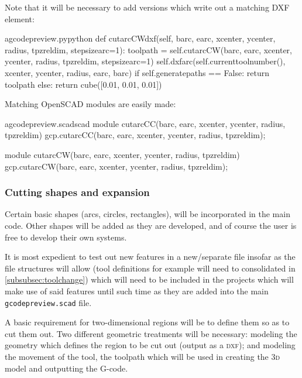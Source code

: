 \documentclass{ltxdoc}
\begin{document}
Note that it will be necessary to add versions which write out a matching DXF element:


\lstset{firstnumber=\thegcpy}
\begin{writecode}{a}{gcodepreview.py}{python}
    def cutarcCWdxf(self, barc, earc, xcenter, ycenter, radius, tpzreldim, stepsizearc=1):
        toolpath = self.cutarcCW(barc, earc, xcenter, ycenter, radius, tpzreldim, stepsizearc=1)
        self.dxfarc(self.currenttoolnumber(), xcenter, ycenter, radius, earc, barc)
        if self.generatepaths == False:
            return toolpath
        else:
            return cube([0.01, 0.01, 0.01])


\end{writecode}
\addtocounter{gcpy}{45}

Matching OpenSCAD modules are easily made:

\lstset{firstnumber=\thegcpscad}
\begin{writecode}{a}{gcodepreview.scad}{scad}
module cutarcCC(barc, earc, xcenter, ycenter, radius, tpzreldim){
    gcp.cutarcCC(barc, earc, xcenter, ycenter, radius, tpzreldim);
}

module cutarcCW(barc, earc, xcenter, ycenter, radius, tpzreldim){
    gcp.cutarcCW(barc, earc, xcenter, ycenter, radius, tpzreldim);
}

\end{writecode}
\addtocounter{gcpscad}{8}

\subsubsection{Cutting shapes and expansion}

Certain basic shapes (arcs, circles, rectangles), will be incorporated in the main code. Other shapes will be added as they are developed, and of course the user is free to develop their own systems.

 
It is most expedient to test out new features in a new/separate file insofar as the file structures will allow (tool definitions for example will need to consolidated in \ref{subsubsec:toolchange}) which will need to be included in the projects which will make use of said features until such time as they are added into the main \texttt{gcodepreview.scad} file.

A basic requirement for two-dimensional regions will be to define them so as to cut them out. Two different geometric treatments will be necessary: modeling the geometry which defines the region to be cut out (output as a \textsc{dxf}); and modeling the movement of the tool, the toolpath which will be used in creating the \textsc{3d} model and outputting the G-code.
\end{document}
